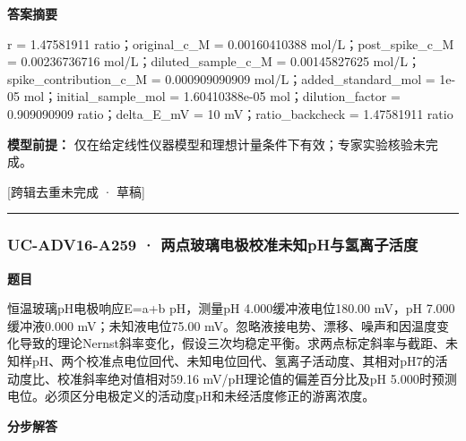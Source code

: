 \documentclass[UTF8,11pt,a4paper]{ctexart}
\begin{document}
\noindent\textbf{答案摘要}\par
r = 1.47581911 ratio；original\_c\_M = 0.00160410388 mol/L；post\_spike\_c\_M = 0.00236736716 mol/L；diluted\_sample\_c\_M = 0.00145827625 mol/L；spike\_contribution\_c\_M = 0.000909090909 mol/L；added\_standard\_mol = 1e-05 mol；initial\_sample\_mol = 1.60410388e-05 mol；dilution\_factor = 0.909090909 ratio；delta\_E\_mV = 10 mV；ratio\_backcheck = 1.47581911 ratio\par
\noindent\textbf{模型前提：}
仅在给定线性仪器模型和理想计量条件下有效；专家实验核验未完成。\par
\noindent\textcolor{red!65!black}{[跨辑去重未完成 · 草稿]} \par
\medskip\hrule\medskip
{}
\subsubsection*{UC-ADV16-A259 · 两点玻璃电极校准未知pH与氢离子活度}
\noindent\textbf{题目}\par
恒温玻璃pH电极响应E=a+b pH，测量pH 4.000缓冲液电位180.00 mV，pH 7.000缓冲液0.000 mV；未知液电位75.00 mV。忽略液接电势、漂移、噪声和因温度变化导致的理论Nernst斜率变化，假设三次均稳定平衡。求两点标定斜率与截距、未知样pH、两个校准点电位回代、未知电位回代、氢离子活动度、其相对pH7的活动度比、校准斜率绝对值相对59.16 mV/pH理论值的偏差百分比及pH 5.000时预测电位。必须区分电极定义的活动度pH和未经活度修正的游离浓度。\par
\medskip\noindent\textbf{分步解答}
\end{document}
